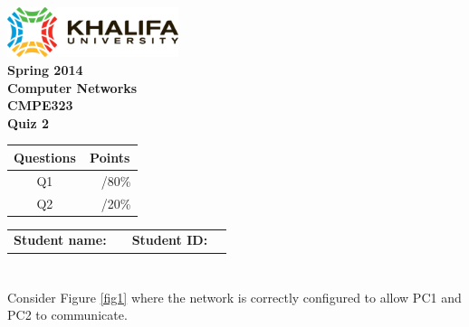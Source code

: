 \documentclass[pdftex,12pt,a4paper]{article}
\begin{document}
    \begin{titlepage}
        \begin{center}
            \includegraphics[width=5cm]{figures/kulogo}\\[1cm]
            {\large \bfseries
                Spring 2014\\
                Computer Networks\\
                CMPE323\\[1cm]
            }
            {\large \bfseries
                \noindent Quiz 2\\[1cm]
            }
        \end{center}

        \begin{center}
            \begin{tabular}{|c|p{1cm}l|}\hline
                \textbf{Questions} & \multicolumn{2}{|c|}{\textbf{Points}} \\\hline
                Q1                &    &    /80\%   \\\hline
                Q2                &    &    /20\%   \\\hline
            \end{tabular}
        \end{center}

        \vfill
        \begin{tabular}{lp{5cm}ll}
            \textbf{Student name:} & & \textbf{Student ID:} & \\
        \end{tabular}


    \end{titlepage}
    \newpage

    \section{}
        Consider Figure \ref{fig1} where the network is correctly configured
        to allow PC1 and PC2 to communicate.
\end{document}
